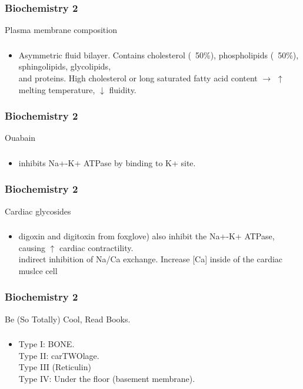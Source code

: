\documentclass[11pt]{beamer}
\begin{document}
\begin{frame}
 \frametitle{Biochemistry 2}
Plasma membrane composition
\end{frame}

\begin{frame}
 \frametitle{}
\begin{itemize}
\item Asymmetric fluid bilayer. Contains cholesterol (~50\%), phospholipids (~50\%), sphingolipids, glycolipids, \\ and proteins. High cholesterol or long saturated fatty acid content ${\rightarrow}$ ${\uparrow}$ melting temperature, ${\downarrow}$ fluidity.
\end{itemize}
\end{frame}

\begin{frame}
 \frametitle{Biochemistry 2}
Ouabain
\end{frame}

\begin{frame}
 \frametitle{}
\begin{itemize}
\item inhibits Na+-K+ ATPase  by binding to K+ site.
\end{itemize}
\end{frame}

\begin{frame}
 \frametitle{Biochemistry 2}
Cardiac glycosides
\end{frame}

\begin{frame}
 \frametitle{}
\begin{itemize}
\item digoxin and digitoxin from foxglove) also inhibit the Na+-K+ ATPase, causing ${\uparrow}$ cardiac contractility. \\ indirect inhibition of Na/Ca exchange. Increase [Ca] inside of the cardiac muslce cell
\end{itemize}
\end{frame}

\begin{frame}
 \frametitle{Biochemistry 2}
Be (So Totally) Cool, Read Books.
\end{frame}

\begin{frame}
 \frametitle{}
\begin{itemize}
\item Type I: BONE. \\ Type II: carTWOlage. \\ Type III (Reticulin) \\ Type IV: Under the floor (basement membrane).
\end{itemize}
\end{frame}
\end{document}
